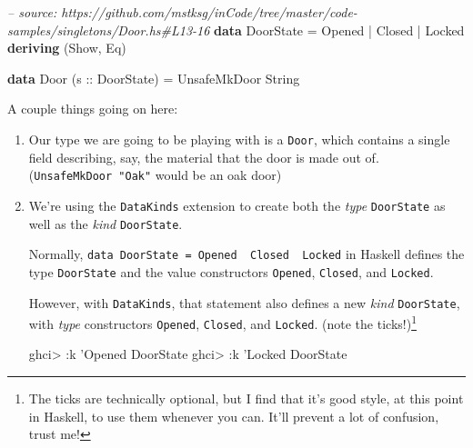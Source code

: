 \documentclass[]{article}
\newenvironment{Shaded}{}{}
\newcommand{\KeywordTok}[1]{\textcolor[rgb]{0.00,0.44,0.13}{\textbf{#1}}}
\newcommand{\DataTypeTok}[1]{\textcolor[rgb]{0.56,0.13,0.00}{#1}}
\newcommand{\CharTok}[1]{\textcolor[rgb]{0.25,0.44,0.63}{#1}}
\newcommand{\CommentTok}[1]{\textcolor[rgb]{0.38,0.63,0.69}{\textit{#1}}}
\newcommand{\OtherTok}[1]{\textcolor[rgb]{0.00,0.44,0.13}{#1}}
\newcommand{\FunctionTok}[1]{\textcolor[rgb]{0.02,0.16,0.49}{#1}}
\newcommand{\NormalTok}[1]{#1}
\begin{document}
\begin{Shaded}
\begin{Highlighting}[]
\CommentTok{-- source: https://github.com/mstksg/inCode/tree/master/code-samples/singletons/Door.hs#L13-16}
\KeywordTok{data} \DataTypeTok{DoorState} \FunctionTok{=} \DataTypeTok{Opened} \FunctionTok{|} \DataTypeTok{Closed} \FunctionTok{|} \DataTypeTok{Locked}
  \KeywordTok{deriving}\NormalTok{ (}\DataTypeTok{Show}\NormalTok{, }\DataTypeTok{Eq}\NormalTok{)}

\KeywordTok{data} \DataTypeTok{Door}\NormalTok{ (}\OtherTok{s ::} \DataTypeTok{DoorState}\NormalTok{) }\FunctionTok{=} \DataTypeTok{UnsafeMkDoor} \DataTypeTok{String}
\end{Highlighting}
\end{Shaded}

A couple things going on here:

\begin{enumerate}
\def\labelenumi{\arabic{enumi}.}
\item
  Our type we are going to be playing with is a \texttt{Door}, which contains a
  single field describing, say, the material that the door is made out of.
  (\texttt{UnsafeMkDoor\ "Oak"} would be an oak door)
\item
  We're using the \texttt{DataKinds} extension to create both the \emph{type}
  \texttt{DoorState} as well as the \emph{kind} \texttt{DoorState}.

  Normally,
  \texttt{data\ DoorState\ =\ Opened\ \textbar{}\ Closed\ \textbar{}\ Locked} in
  Haskell defines the type \texttt{DoorState} and the value constructors
  \texttt{Opened}, \texttt{Closed}, and \texttt{Locked}.

  However, with \texttt{DataKinds}, that statement also defines a new
  \emph{kind} \texttt{DoorState}, with \emph{type} constructors
  \texttt{\textquotesingle{}Opened}, \texttt{\textquotesingle{}Closed}, and
  \texttt{\textquotesingle{}Locked}. (note the \texttt{\textquotesingle{}}
  ticks!)\footnote{The \texttt{\textquotesingle{}} ticks are technically
    optional, but I find that it's good style, at this point in Haskell, to use
    them whenever you can. It'll prevent a lot of confusion, trust me!}

\begin{Shaded}
\begin{Highlighting}[]
\NormalTok{ghci}\FunctionTok{>} \FunctionTok{:}\NormalTok{k }\CharTok{'Opened}
\DataTypeTok{DoorState}
\NormalTok{ghci}\FunctionTok{>} \FunctionTok{:}\NormalTok{k }\CharTok{'Locked}
\DataTypeTok{DoorState}
\end{Highlighting}
\end{Shaded}
\end{enumerate}
\end{document}
